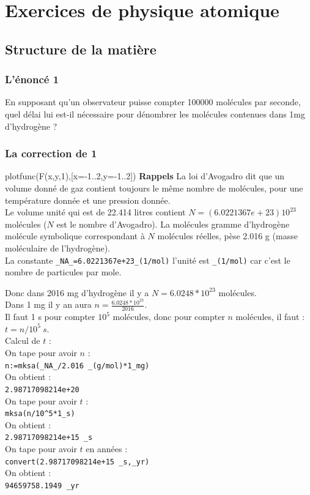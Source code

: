 \documentclass[a4paper,11pt]{book}
\begin{document}
\chapter{Exercices de physique atomique}
\section{Structure de la mati\`ere}
\subsection{L'\'enonc\'e 1}
En supposant qu'un observateur puisse compter 100000 mol\'ecules par seconde, 
quel d\'elai lui est-il n\'ecessaire pour d\'enombrer les mol\'ecules contenues
dans 1mg d'hydrog\`ene ?
\subsection{La correction de 1}plotfunc(F(x,y,1),[x=-1..2,y=-1..2])
{\bf Rappels}
La loi d'Avogadro dit que un volume donn\'e de gaz contient toujours le m\^eme 
nombre de mol\'ecules, pour une temp\'erature donn\'ee et une pression 
donn\'ee.\\
Le volume unit\'e qui est de 22.414 litres contient $N=(6.0221367e+23)10^{23}$
mol\'ecules ($N$ est le nombre d'Avogadro). La mol\'ecules gramme 
d'hydrog\`ene mol\'ecule symbolique correspondant \`a $N$ mol\'ecules 
r\'eelles, p\`ese 2.016 g (masse mol\'eculaire de l'hydrog\`ene).\\
La constante {\tt \_NA\_=6.0221367e+23\_(1/mol)} l'unit\'e est  {\tt \_(1/mol)}
car c'est le nombre de particules par mole.

Donc dans 2016 mg d'hydrog\`ene il y a $N= 6.0248*10^{23}$ mol\'ecules.\\
Dans 1 mg il y an aura $n=\frac{6.0248*10^{23}}{2016}$.\\
Il faut 1 s pour compter $10^5$ mol\'ecules, donc pour compter $n$ mol\'ecules,
il faut : $t=n/10^5\ s$.\\
Calcul de $t$ :\\
On tape pour avoir $n$ :\\
{\tt n:=mksa(\_NA\_/2.016 \_(g/mol)*1\_mg)}\\   
On obtient :\\
{\tt 2.98717098214e+20}\\
On tape pour avoir $t$ :\\
{\tt mksa(n/10\verb|^|5*1\_s)}\\   
On obtient :\\
{\tt 2.98717098214e+15 \_s}\\
On tape pour avoir $t$ en ann\'ees :\\
{\tt convert(2.98717098214e+15 \_s,\_yr)} \\  
On obtient :\\
{\tt 94659758.1949 \_yr}
\end{document}
